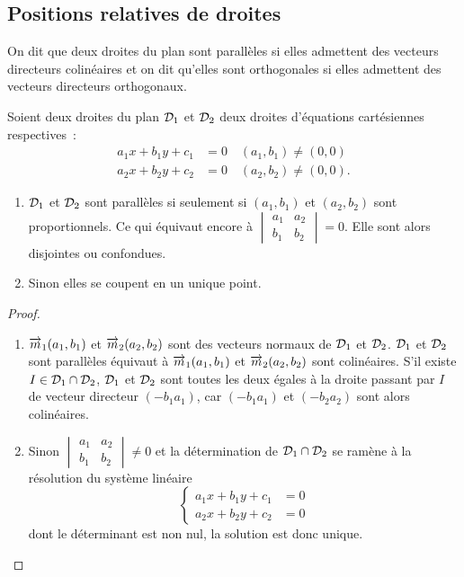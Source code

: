 \subsection{Positions relatives de droites}
On dit que deux droites du plan sont parallèles si elles admettent des
vecteurs directeurs colinéaires et on dit qu'elles sont orthogonales si elles
admettent des vecteurs directeurs orthogonaux.

\begin{prop}
  Soient deux droites du plan \(\mathcal{D}_1\) et \(\mathcal{D}_2\) deux droites d'équations
  cartésiennes respectives~:
  \begin{align}
    a_1x + b_1y + c_1& = 0 \quad (a_1 , b_1)\neq(0 , 0)\\
    a_2x + b_2y + c_2& = 0 \quad (a_2 , b_2)\neq(0 , 0).
  \end{align}

  \begin{enumerate}
    \item \(\mathcal{D}_1\) et \(\mathcal{D}_2\) sont parallèles si seulement si \((a_1 ,
      b_1)\) et \((a_2 , b_2)\) sont proportionnels. Ce qui équivaut encore à
      \(
      \begin{vmatrix}
        a_1 & a_2 \\
        b_1 & b_2
      \end{vmatrix} = 0\).
      Elle sont alors disjointes ou confondues.
    \item Sinon elles se coupent en un unique point.
  \end{enumerate}
\end{prop}

\begin{proof}
  \begin{enumerate}
    \item \(\overrightarrow{m}_1(a_1 , b_1)\) et \(\overrightarrow{m}_2(a_2 , b_2)\) sont des
      vecteurs normaux de \(\mathcal{D}_1\) et \(\mathcal{D}_2\). \(\mathcal{D}_1\) et \(\mathcal{D}_2\) sont
      parallèles équivaut à \(\overrightarrow{m}_1(a_1 , b_1)\) et \(\overrightarrow{m}_2(a_2 ,
      b_2)\) sont colinéaires. S'il existe \(I \in \mathcal{D}_1 \cap \mathcal{D}_2\),
      \(\mathcal{D}_1\) et \(\mathcal{D}_2\) sont toutes les deux égales à la droite passant
      par \(I\) de vecteur directeur \((-b_1 a_1)\), car \((-b_1 a_1)\) et
      \((-b_2 a_2)\) sont alors colinéaires.
    \item Sinon \(\begin{vmatrix} a_1 & a_2 \\ b_1 & b_2 \end{vmatrix} \neq
      0\) et la détermination de \(\mathcal{D}_1 \cap \mathcal{D}_2\) se ramène à la
      résolution du système linéaire
      \begin{equation}
        \begin{cases}
          a_1x + b_1y + c_1 & = 0 \\
          a_2x + b_2y + c_2 & = 0
        \end{cases}
      \end{equation}
      dont le déterminant est non nul, la solution est donc unique.
  \end{enumerate}
\end{proof}

